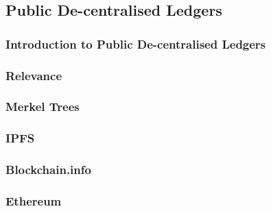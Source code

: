 \subsection{Public De-centralised Ledgers}

\subsubsection{Introduction to Public De-centralised Ledgers}

\subsubsection{Relevance}

\subsubsection{Merkel Trees}


\subsubsection{IPFS}

\subsubsection{Blockchain.info}

\subsubsection{Ethereum}

